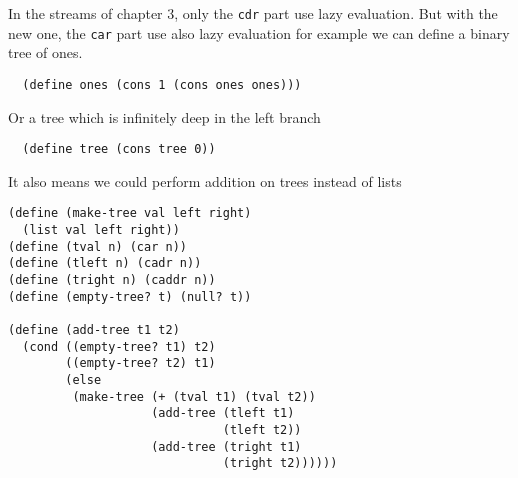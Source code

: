 \documentclass[a4paper,12pt]{article}
\begin{document}
In the streams of chapter 3, only the \lstinline!cdr! part use lazy
evaluation.  But with the new one, the \lstinline!car! part use also
lazy evaluation for example we can define a  binary tree of ones.

\begin{lstlisting}
  (define ones (cons 1 (cons ones ones)))
\end{lstlisting}

Or a tree which is infinitely deep in the left branch

\begin{lstlisting}
  (define tree (cons tree 0))
\end{lstlisting}

It also means we could perform addition on trees instead of lists

\begin{lstlisting}
(define (make-tree val left right)
  (list val left right))
(define (tval n) (car n))
(define (tleft n) (cadr n))
(define (tright n) (caddr n))
(define (empty-tree? t) (null? t))

(define (add-tree t1 t2)
  (cond ((empty-tree? t1) t2)
        ((empty-tree? t2) t1)
        (else
         (make-tree (+ (tval t1) (tval t2))
                    (add-tree (tleft t1)
                              (tleft t2))
                    (add-tree (tright t1)
                              (tright t2))))))
\end{lstlisting}
\end{document}
